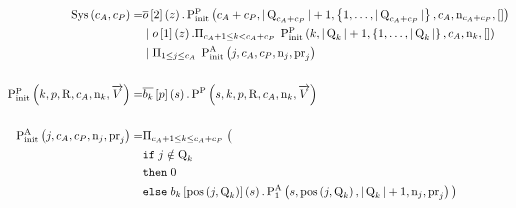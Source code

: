 \begin{align*}
\operatorname{Sys}\left(c_A, c_P\right) =
&
    \overline{o}\left[2\right]\left(z\right).
    \textstyle\operatorname{P^{P}_{init}}\left(
        c_A + c_P,
        |\operatorname{Q}_{c_A + c_P}| + 1,
        \left\{1,\ldots,|\operatorname{Q}_{c_A + c_P}|\right\},
        c_A,
        \operatorname{n}_{c_A + c_P},
        \mathtt{[]}
    \right)\\
&\; | \;
    o\left[1\right]\left(z\right).
    \Pi_{c_A + 1 \leq k < c_A + c_P}\; \textstyle\operatorname{P^{P}_{init}}\left(
        k,
        |\operatorname{Q}_{k}| + 1,
        \left\{1,\ldots,|\operatorname{Q}_{k}|\right\},
        c_A,
        \operatorname{n}_{k},
        \mathtt{[]}
    \right)\\
&\; | \;
    \Pi_{1 \leq j \leq c_A}\;
    \operatorname{P^{A}_{init}}\left(
        j,
        c_A,
        c_P,
        \operatorname{n}_{j},
        \operatorname{pr}_{j}
    \right)
\\\\
\textstyle\operatorname{P^{P}_{init}}\left(
    k,
    p,
    \operatorname{R},
    c_A,
    \operatorname{n}_{k},
    \overrightarrow{V}
\right) =
&
    \overline{b_{k}}\left[p\right]\left(s\right) .
    \operatorname{P^{P}_{}}\left(
        s,
        k,
        p,
        \operatorname{R},
        c_A,
        \operatorname{n}_{k},
        \overrightarrow{V}
    \right)
\\\\
\operatorname{P^{A}_{init}}\left(
    j,
    c_A,
    c_P,
    \operatorname{n}_{j},
    \operatorname{pr}_{j}
\right) =
&
    \Pi_{c_A + 1 \leq k \leq c_A + c_P}\;\big(\\
&
    \mathtt{if}\; j\notin\operatorname{Q}_{k}\\
&
    \mathtt{then}\; 0\\
&
    \mathtt{else}\;
        b_{k}\left[\operatorname{pos}\left(j, \operatorname{Q}_{k}\right)\right]\left(s\right).
        \operatorname{P^{A}_{1}}\left(
            s,
            \operatorname{pos}\left(j, \operatorname{Q}_{k}\right),
            |\operatorname{Q}_{k}| + 1,
            \operatorname{n}_{j},
            \operatorname{pr}_{j}
        \right)
\big)
\end{align*}

